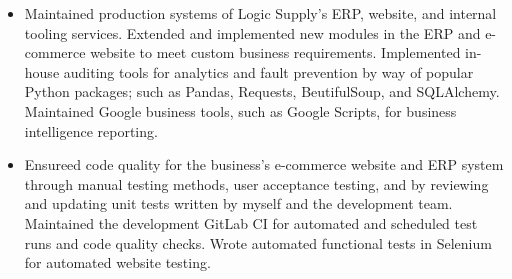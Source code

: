 \documentclass[10pt,a4paper]{altacv}
\begin{document}

\begin{fullwidth}
\makecvheader
\end{fullwidth}


\begin{itemize}
\item Maintained production systems of Logic Supply's ERP, website, and internal tooling
services. Extended and implemented new modules in the ERP and e-commerce website to meet custom business requirements. Implemented in-house auditing tools for analytics and fault prevention by way of popular Python packages; such as Pandas, Requests, BeutifulSoup, and SQLAlchemy.
Maintained Google business tools, such as Google Scripts, for business intelligence reporting.
\end{itemize}

\divider

\begin{itemize}
\item Ensureed code quality for the business’s e-commerce website and ERP system through
manual testing methods, user acceptance testing, and by reviewing and
updating unit tests written by myself and the development team. Maintained the development GitLab CI for automated and scheduled test runs and code quality checks. Wrote automated functional tests in Selenium for automated website testing.
\end{itemize}
\end{document}
